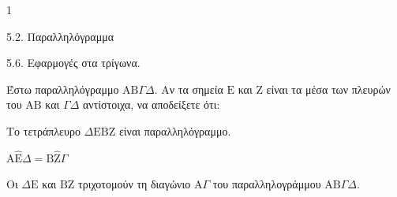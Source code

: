\begin{ylh}{1}
    \item 5.2. Παραλληλόγραμμα
    \item 5.6. Εφαρμογές στα τρίγωνα.
\end{ylh}
Έστω παραλληλόγραμμο $\mathrm{A}\mathrm{B}\Gamma\Delta$. Αν τα σημεία $\mathrm{E}$ και $\mathrm{Z}$ είναι τα μέσα των πλευρών του $\mathrm{A}\mathrm{B}$ και $\Gamma\Delta$ αντίστοιχα, να αποδείξετε ότι:
\begin{alist}
    \item Το τετράπλευρο $\Delta\mathrm{E}\mathrm{B}\mathrm{Z}$ είναι παραλληλόγραμμο. 
    \item $\mathrm{A}\hat{\mathrm{E}}\Delta = \mathrm{B}\hat{\mathrm{Z}}\Gamma$ 
    \item Οι $\Delta\mathrm{E}$ και $\mathrm{B}\mathrm{Z}$ τριχοτομούν τη διαγώνιο $\mathrm{A}\Gamma$ του παραλληλογράμμου $\mathrm{A}\mathrm{B}\Gamma\Delta$. 
\end{alist}
